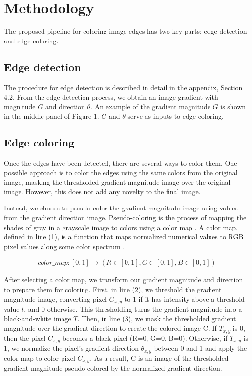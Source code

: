 \documentclass{article}
\begin{document}
\section{Methodology}

The proposed pipeline for coloring image edges has two key parts: edge detection and edge coloring.

\subsection{Edge detection}

The procedure for edge detection is described in detail in the appendix, Section 4.2. From the edge detection process, we obtain an image gradient with magnitude $G$ and direction $\theta$. An example of the gradient magnitude $G$ is shown in the middle panel of Figure 1. $G$ and $\theta$ serve as inputs to edge coloring.


\subsection{Edge coloring}

Once the edges have been detected, there are several ways to color them. One possible approach is to color the edges using the same colors from the original image, masking the thresholded gradient magnitude image over the original image. However, this does not add any novelty to the final image.

Instead, we choose to pseudo-color the gradient magnitude image using values from the gradient direction image. Pseudo-coloring is the process of mapping the shades of gray in a grayscale image to colors using a color map \cite{pseudo_color}. A color map, defined in line (1), is a function that maps normalized numerical values to RGB pixel values along some color spectrum \cite{color_map}.

\begin{align}
color\_map: [0, 1] \rightarrow (R \in [0,1], G \in [0,1], B \in [0,1])
\end{align}

After selecting a color map, we transform our gradient magnitude and direction to prepare them for coloring. First, in line (2), we threshold the gradient magnitude image, converting pixel $G_{x,y}$ to 1 if it has intensity above a threshold value $t$, and 0 otherwise. This thresholding turns the gradient magnitude into a black-and-white image $T$. Then, in line (3), we mask the thresholded gradient magnitude over the gradient direction to create the colored image C. If $T_{x,y}$ is 0, then the pixel $C_{x, y}$ becomes a black pixel (R=0, G=0, B=0). Otherwise, if $T_{x,y}$ is 1, we normalize the pixel's gradient direction $\theta_{x, y}$ between 0 and 1 and apply the color map to color pixel $C_{x, y}$. As a result, C is an image of the thresholded gradient magnitude pseudo-colored by the normalized gradient direction.
\end{document}
